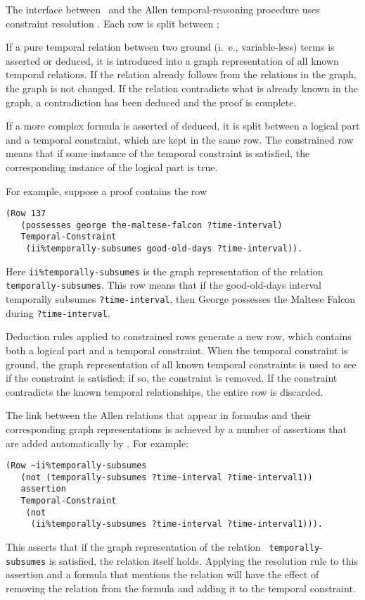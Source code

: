 The interface between \snark\  and the Allen temporal-reasoning procedure uses
constraint resolution \cite{burckert}.  Each row is split between ;

If a pure temporal relation between two ground (i.\ e., variable-less) terms is
asserted or deduced, it is introduced into a graph representation of all
known temporal relations.  If the relation already follows from the relations
in the graph, the graph is not changed. If the relation contradicts what is
already known in the graph, a contradiction has been deduced and the proof is
complete.

If a more complex formula is asserted of deduced, it is split between a
logical part and a temporal constraint, which are kept in the same row.
The constrained row means that if
some instance of the temporal constraint is satisfied,  the corresponding
instance of the logical part is true.


For example, suppose a proof contains the row
\begin{verbatim}
(Row 137
   (possesses george the-maltese-falcon ?time-interval)
   Temporal-Constraint
    (ii%temporally-subsumes good-old-days ?time-interval)).
\end{verbatim}
Here \verb'ii%temporally-subsumes' is the graph representation of the relation
{\tt temporally-subsumes}.  This row means that if the good-old-days interval
temporally subsumes {\tt ?time-interval}, then George possesses the Maltese
Falcon during {\tt ?time-interval}.



Deduction rules applied to constrained rows generate a new row, which
contains both a logical part and a temporal constraint.
 When the temporal constraint is ground, the graph representation of all known
temporal constraints is used to see if the constraint is satisfied;  if so,
the constraint is removed.  If the constraint contradicts the known temporal
relationships, the entire row is discarded.


The link between the Allen relations that appear in formulas and their
corresponding graph representations is achieved by a number of assertions
that are added automatically by \snark\/.  For example:
\begin{verbatim}
(Row ~ii%temporally-subsumes
   (not (temporally-subsumes ?time-interval ?time-interval1))
   assertion
   Temporal-Constraint
    (not
     (ii%temporally-subsumes ?time-interval ?time-interval1))).
\end{verbatim}
This asserts that if the graph representation of the relation {\tt
temporally}-{\tt subsumes} is satisfied, the relation itself holds.  Applying
the resolution rule to this assertion and a formula that mentions the
relation will have the effect of removing the relation from the formula and
adding it to the temporal constraint.

